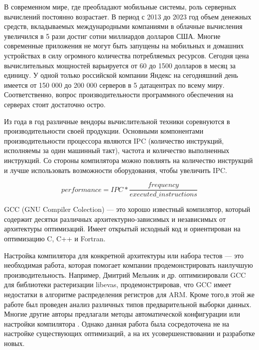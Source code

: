 
{\actuality} В современном мире, где преобладают мобильные системы, роль серверных вычислений постоянно возрастает. В период с 2013 до 2023 год объем денежных средств, вкладываемых  международными компаниями в облачные вычисления увеличился в 5 раз\ifsynopsis\else\phantom{ }\cite{spendingCloud,alam2020cloud}\phantom{ }\fi\phantom{ }и достиг сотни миллиардов долларов США. Многие современные приложения не могут быть запущены на мобильных и домашних устройствах в силу огромного количества потребляемых ресурсов\ifsynopsis\else\phantom{ }\cite{marinescu2022cloud}\fi. Сегодня цена вычислительных мощностей варьируется от 60 до 1500  долларов в месяц за единицу\ifsynopsis\else\phantom{ }\cite{costCloud}\fi.  У одной только российской компании Яндекс на сегодняшний день имеется от 150 000  до 200 000 серверов в 5 датацентрах по всему миру\ifsynopsis\else \phantom{ }\cite{Yndx2}\fi. Соответственно, вопрос производительности программного обеспечения на серверах стоит достаточно остро.

Из года в год различные вендоры вычислительной техники соревнуются в производительности своей продукции. Основными компонентами производительности процессора являются IPC (количество инструкций, исполняемы за один машинный такт), частота и количество выполненных инструкций\ifsynopsis\else\phantom{ }\cite{hennessy2011computer}\fi. Со стороны компилятора можно повлиять на количество инструкций и лучше использовать возможности оборудования, чтобы увеличить IPC\ifsynopsis\else \cite{alvares2021instruction}\fi.

$$performance = IPC * \dfrac{frequency}{executed\_instructions}$$

GCC (GNU Compiler Colection) — это хорошо известный компилятор\ifsynopsis\else\phantom{ }\cite{schmitt2020performance}\fi, который содержит десятки различных архитектурно-зависимых и независимых от архитектуры оптимизаций\ifsynopsis\else\phantom{ }\cite {rodriguez2021compiler}\fi. Имеет открытый исходный код и ориентирован на оптимизацию C, C++ и Fortran.

Настройка компилятора для конкретной архитектуры или набора тестов — это необходимая работа, которая помогает компании продемонстрировать наилучшую производительность. Например, Дмитрий Мельник и др. \ifsynopsis\else\phantom{ }\cite{melnik2010case}\phantom{ }\fi оптимизировали GCC для библиотеки растеризации libevas, продемонстрировав, что GCC имеет недостатки в алгоритме распределения регистров для ARM. Кроме того,в этой же работе был проведен анализ различных типов предварительной выборки данных. Многие другие авторы предлагали методы автоматической конфигурации или настройки компилятора \ifsynopsis\else\phantom{ }\cite{plotnikov2013automatic,ashouri2018survey,cereda2020collaborative}\fi. Однако данная работа была сосредоточена не на настройке существующих оптимизаций, а на их усовершенствовании и разработке новых.



